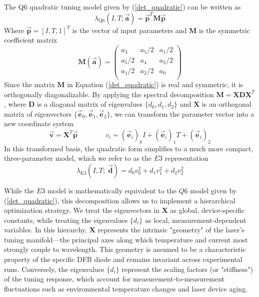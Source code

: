 \documentclass[12pt]{report}
\begin{document}
	The Q6 quadratic tuning model given by (\ref{det_quadratic}) can be written as
	\begin{equation}
		\lambda_\mathrm{Q6}(I, T; \vec{\mathbf{a}}) = \vec{\mathbf{p}}^T \mathbf{M} \vec{\mathbf{p}}
	\end{equation}
	Where $\vec{\mathbf{p}} = [I, T, 1]^T$ is the vector of input parameters and $\mathbf{M}$ is the symmetric coefficient matrix
	\begin{equation} \label{det_coeff_mat_a}
		\mathbf{M}(\vec{\textbf{a}}) = 
		\begin{pmatrix}
			a_3 & a_5/2 & a_1/2 \\
			a_5/2 & a_4 & a_2/2 \\
			a_1/2 & a_2/2 & a_0 \\
		\end{pmatrix}
	\end{equation}
	Since the matrix $\mathbf{M}$ in Equation (\ref{det_quadratic}) is real and symmetric, it is orthogonally diagonalizable. By applying the spectral decomposition $\mathbf{M} = \mathbf{X}\mathbf{D}\mathbf{X}^T$, where $\mathbf{D}$ is a diagonal matrix of eigenvalues $\{d_0, d_1, d_2\}$ and $\mathbf{X}$ is an orthogonal matrix of eigenvectors $\{\vec{\mathbf{e}}_0, \vec{\mathbf{e}}_1, \vec{\mathbf{e}}_2\}$, we can transform the parameter vector into a new coordinate system
	\begin{equation}
		\vec{\mathbf{v}} = \mathbf{X}^T \vec{\mathbf{p}}
		\qquad \qquad
		v_i = \left(\vec{\textbf{e}}_i\right)_0 I + \left(\vec{\textbf{e}}_i\right)_1 T + \left(\vec{\textbf{e}}_i\right)_2
	\end{equation}
	In this transformed basis, the quadratic form simplifies to a much more compact, three-parameter model, which we refer to as the $E3$ representation
	\begin{equation} \label{det_eigenModel}
		\lambda_\mathrm{E3}(I, T;\; \vec{\textbf{d}}) = d_0 v_0^2 + d_1 v_1^2 + d_2 v_2^2
	\end{equation}
	
	While the $E3$ model is mathematically equivalent to the $Q6$ model given by (\ref{det_quadratic}), this decomposition allows us to implement a hierarchical optimization strategy. We treat the eigenvectors in $\mathbf{X}$ as global, device-specific constants, while treating the eigenvalues $\{d_i\}$ as local, measurement-dependent variables. In this hierarchy, $\mathbf{X}$ represents the intrinsic "geometry" of the laser's tuning manifold—the principal axes along which temperature and current most strongly couple to wavelength. This geometry is assumed to be a characteristic property of the specific DFB diode and remains invariant across experimental runs. Conversely, the eigenvalues $\{d_i\}$ represent the scaling factors (or "stiffness") of the tuning response, which account for measurement-to-measurement fluctuations such as environmental temperature changes and laser device aging.
	
\end{document}
